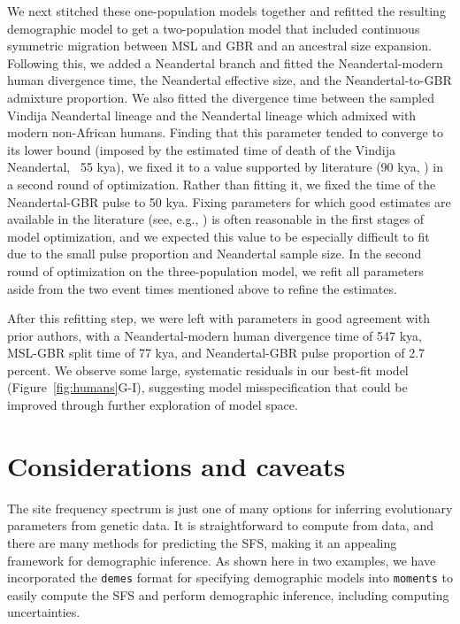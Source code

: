\documentclass[]{article}
\newcommand{\moments}{\texttt{moments}\xspace}
\newcommand{\demes}{\texttt{demes}\xspace}
\begin{document}
We next stitched these one-population models together and refitted the 
resulting demographic model to get a two-population model 
that included continuous symmetric 
migration between MSL and GBR and an ancestral size expansion. Following this,
we added a Neandertal branch and fitted the 
Neandertal-modern human divergence time, the Neandertal effective size, and the 
Neandertal-to-GBR admixture proportion. We also fitted the divergence time 
between the sampled Vindija Neandertal lineage and the Neandertal lineage which 
admixed with modern non-African humans. Finding that this parameter tended to 
converge to its lower bound (imposed by the estimated time of death of the 
Vindija Neandertal, ~55 kya), we fixed it to a value supported by literature 
(90 kya, \cite{prufer2017high}) in a second round of optimization.
Rather than fitting it, we fixed the time of the Neandertal-GBR pulse to 50 kya.
Fixing parameters for which good estimates are available in the literature 
(see, e.g., \cite{sumer2025earliest}) is often reasonable in the first stages of 
model optimization, and we expected this value to be especially difficult to fit 
due to the small pulse proportion and Neandertal sample size. In the second 
round of optimization on the three-population model, we refit all parameters 
aside from the two event times mentioned above to refine the estimates. 

After this refitting step, we were left with parameters in good agreement with 
prior authors, with a Neandertal-modern human divergence time of 547 kya, 
MSL-GBR split time of 77 kya, and Neandertal-GBR pulse proportion of 2.7 
percent. We observe some large, systematic residuals in our best-fit model 
(Figure~\ref{fig:humans}G-I), suggesting model misspecification that could be
improved through further exploration of model space.


\section*{Considerations and caveats}\label{sec:conclusions}

The site frequency spectrum is just one of many options for inferring
evolutionary parameters from genetic data. It is straightforward to compute
from data, and there are many methods for predicting the SFS, making it an
appealing framework for demographic inference. As shown here in two examples,
we have incorporated the \demes format for specifying demographic models into
\moments to easily compute the SFS and perform demographic inference, including
computing uncertainties.
\end{document}
